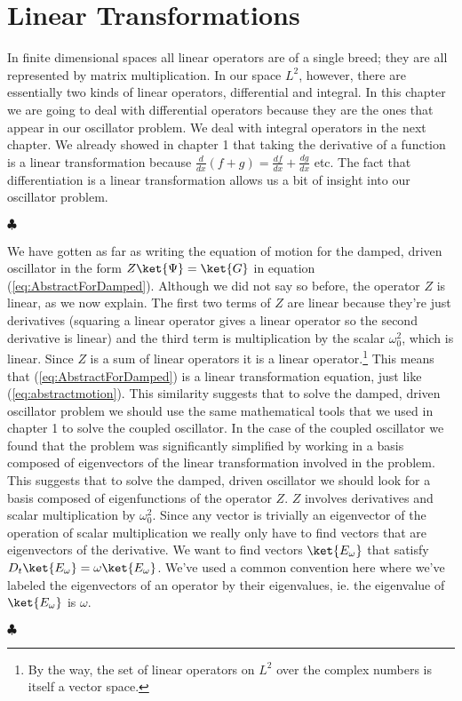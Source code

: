 \section{Linear Transformations}

In finite dimensional spaces all linear operators are of a single breed; they are all represented by matrix multiplication.  In our space $L^2$, however, there are essentially two kinds of linear operators, differential and integral.  In this chapter we are going to deal with differential operators because they are the ones that appear in our oscillator problem.  We deal with integral operators in the next chapter.  We already showed in chapter 1 that taking the derivative of a function is a linear transformation because \mbox{$\frac{d}{dx}(f+g) = \frac{df}{dx}+\frac{dg}{dx}$} etc.  The fact that differentiation is a linear transformation allows us a bit of insight into our oscillator problem.

\begin{flushleft} $\clubsuit$ \end{flushleft}
We have gotten as far as writing the equation of motion for the damped, driven oscillator in the form \mbox{$Z\ket{\Psi} = \ket{G}$} in equation (\ref{eq:AbstractForDamped}).  Although we did not say so before, the operator $Z$ is linear, as we now explain.  The first two terms of $Z$ are linear because they're just derivatives (squaring a linear operator gives a linear operator so the second derivative is linear) and the third term is multiplication by the scalar $\omega_0^2$, which is linear.  Since $Z$ is a sum of linear operators it is a linear operator.\footnote{By the way, the set of linear operators on $L^2$ over the complex numbers is itself a vector space.}  This means that (\ref{eq:AbstractForDamped}) is a linear transformation equation, just like (\ref{eq:abstractmotion}).  This similarity suggests that to solve the damped, driven oscillator problem we should use the same mathematical tools that we used in chapter 1 to solve the coupled oscillator.  In the case of the coupled oscillator we found that the problem was significantly simplified by working in a basis composed of eigenvectors of the linear transformation involved in the problem.  This suggests that to solve the damped, driven oscillator we should look for a basis composed of eigenfunctions of the operator $Z$.  $Z$ involves derivatives and scalar multiplication by $\omega _0^2$.  Since any vector is trivially an eigenvector of the operation of scalar multiplication we really only have to find vectors that are eigenvectors of the derivative.  We want to find vectors $\ket{E_\omega}$ that satisfy $D_t\ket{E_\omega} = \omega \ket{E_\omega}$.  We've used a common convention here where we've labeled the eigenvectors of an operator by their eigenvalues, ie. the eigenvalue of $\ket{E_\omega}$ is $\omega$.
\begin{flushright} $\clubsuit$ \end{flushright}

